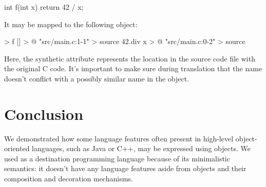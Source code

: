 \documentclass[sigplan,nonacm]{acmart}
\begin{document}
\begin{ffcode}
int f(int x) {
  return 42 / x;
}
\end{ffcode}

It may be mapped to the following \eolang{} object:

\begin{ffcode}
[x] > f
  [] > @
    "src/main.c:1-1" > source
    42.div x > @
  "src/main.c:0-2" > source
\end{ffcode}

Here, the synthetic  attribute represents the location in the source code file with the original C code. It's important to make sure during translation that the name  doesn't conflict with a possibly similar name in the object.

\section{Conclusion}

We demonstrated how some language features often present in high-level object-oriented languages, such as Java or C++, may be expressed using objects.
We used \eolang{} as a destination programming language because of its minimalistic semantics: it doesn't have any language features aside from objects and their composition and decoration mechanisms.

\raggedright


\end{document}
